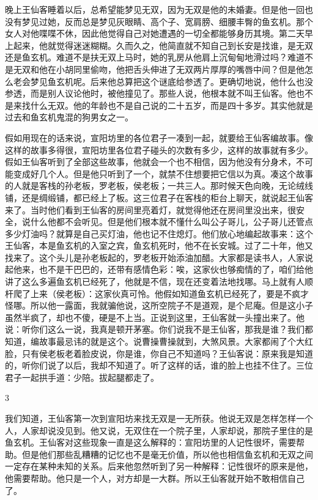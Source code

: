 晚上王仙客睡着以后，总希望能梦见无双，因为无双是他的未婚妻。但是他一回也没有梦见过她，反而总是梦见灰眼睛、高个子、宽肩膀、细腰丰臀的鱼玄机。那个女人对他喋喋不休，因此他觉得自己对她遭遇的一切全都能够身历其境。第二天早上起来，他就觉得迷迷糊糊。久而久之，他简直就不知自己到长安是找谁，是无双还是鱼玄机。难道不是扶无双上马时，她的乳房从他肩上沉甸甸地滑过吗？难道不是无双和他在小胡同里偷吻，他把舌头伸进了无双两片厚厚的嘴唇中间？但是他怎么老会梦见鱼玄机呢。后来他总算把这个谜底给参透了。更确切地说，他什么也没参透，而是别人议论他时，被他撞见了。那些人说，他根本就不叫王仙客。他也不是来找什么无双。他的年龄也不是自己说的二十五岁，而是四十多岁。其实他就是过去和鱼玄机鬼混的狗男女之一。 

假如用现在的话来说，宣阳坊里的各位君子一凑到一起，就要给王仙客编故事。像这样的故事多得很，宣阳坊里各位君子碰头的次数有多少，这样的故事就有多少。假如王仙客听到了全部这些故事，他就会一个也不相信，因为他没有分身术，不可能变成好几个人。但是他只听到了一个，就禁不住想要把它信以为真。凑这个故事的人就是客栈的孙老板，罗老板，侯老板；一共三人。那时候天色向晚，无论绒线铺，还是绸缎铺，都已经上了板。这三位君子在客栈的柜台上聊天，就说起王仙客来了。当时他们看到王仙客的房间里亮着灯，就觉得他还在房间里没出来，很安全，说什么他都不会听见。但是他们根本就不懂什么叫公子哥儿，公子哥儿还管点多少灯油吗？就算是自己买灯油，他也记不住熄灯。他们放心地编起故事来：这个王仙客，本是鱼玄机的入室之宾，鱼玄机死时，他不在长安城。过了二十年，他又找来了。这个头儿是孙老板起的，罗老板开始添油加醋。大家都是读书人，人家说起他来，也不是干巴巴的，还带有感情色彩：唉，这家伙也够痴情的了，咱们给他讲了这么多遍鱼玄机已经死了，他就是不信，现在还变着法地找哪。马上就有人顺杆爬了上来（侯老板）：这家伙真可怜。他假如知道鱼玄机已经死了，要是不疯才怪哪。所以他一露面，我就骗他说，这所空院子不是道观，是个尼庵。但是这小子虽然半疯了，却也不傻，硬是不上当。正说到这里，王仙客就一头撞出来了。他说：听你们这么一说，我真是顿开茅塞。你们说我不是王仙客，那我是谁？我们都知道，编故事最忌讳的就是这个。说曹操曹操就到，大煞风景。大家都闹了个大红脸，只有侯老板老着脸皮说，你是谁，你自己不知道吗？王仙客说：原来我是知道的，听你们说了以后，我却不知道了。听了这样的话，谁的脸上也挂不住了。三位君子一起拱手道：少陪。拔起腿都走了。 

3 

我们知道，王仙客第一次到宣阳坊来找无双是一无所获。他说无双是怎样怎样一个人，人家却说没见到。他又说，无双住在一个院子里，人家却说，那院子里住的是鱼玄机。王仙客对这些现象一直是这么解释的：宣阳坊里的人记性很坏，需要帮助。但是他们那些乱糟糟的记忆也不是毫无价值，所以他也相信鱼玄机和无双之间一定存在某种未知的关系。后来他忽然听到了另一种解释：记性很坏的原来是他，他需要帮助。他只是一个人，对方却是一大群。所以王仙客就开始不敢相信自己了。 

